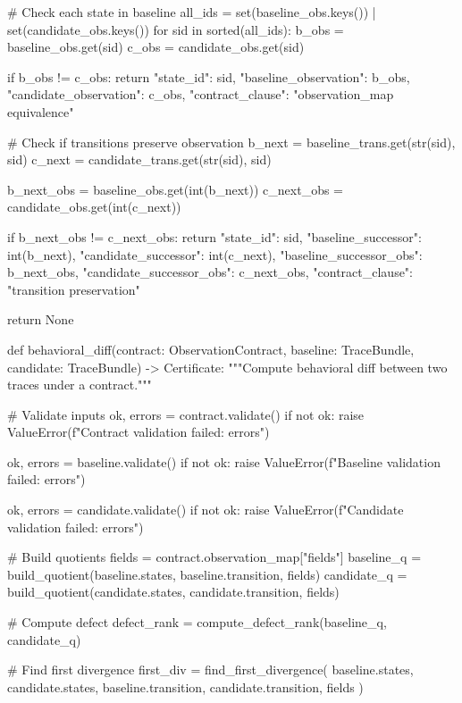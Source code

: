     # Check each state in baseline
    all_ids = set(baseline_obs.keys()) | set(candidate_obs.keys())
    for sid in sorted(all_ids):
        b_obs = baseline_obs.get(sid)
        c_obs = candidate_obs.get(sid)
        
        if b_obs != c_obs:
            return {
                "state_id": sid,
                "baseline_observation": b_obs,
                "candidate_observation": c_obs,
                "contract_clause": "observation_map equivalence"
            }
        
        # Check if transitions preserve observation
        b_next = baseline_trans.get(str(sid), sid)
        c_next = candidate_trans.get(str(sid), sid)
        
        b_next_obs = baseline_obs.get(int(b_next))
        c_next_obs = candidate_obs.get(int(c_next))
        
        if b_next_obs != c_next_obs:
            return {
                "state_id": sid,
                "baseline_successor": int(b_next),
                "candidate_successor": int(c_next),
                "baseline_successor_obs": b_next_obs,
                "candidate_successor_obs": c_next_obs,
                "contract_clause": "transition preservation"
            }
    
    return None

def behavioral_diff(contract: ObservationContract, baseline: TraceBundle, 
                    candidate: TraceBundle) -> Certificate:
    """Compute behavioral diff between two traces under a contract."""
    
    # Validate inputs
    ok, errors = contract.validate()
    if not ok:
        raise ValueError(f"Contract validation failed: {errors}")
    
    ok, errors = baseline.validate()
    if not ok:
        raise ValueError(f"Baseline validation failed: {errors}")
    
    ok, errors = candidate.validate()
    if not ok:
        raise ValueError(f"Candidate validation failed: {errors}")
    
    # Build quotients
    fields = contract.observation_map["fields"]
    baseline_q = build_quotient(baseline.states, baseline.transition, fields)
    candidate_q = build_quotient(candidate.states, candidate.transition, fields)
    
    # Compute defect
    defect_rank = compute_defect_rank(baseline_q, candidate_q)
    
    # Find first divergence
    first_div = find_first_divergence(
        baseline.states, candidate.states,
        baseline.transition, candidate.transition,
        fields
    )
    
